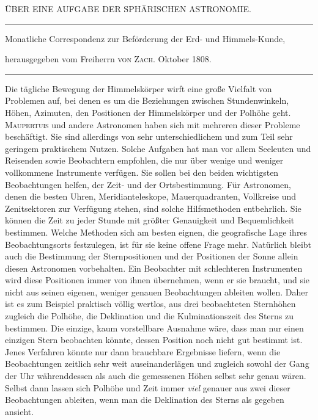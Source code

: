\clearpage{}%
\begin{center}
{\small ÜBER EINE AUFGABE DER SPHÄRISCHEN ASTRONOMIE.\par}
\medskip\hrule\medskip
{\small Monatliche Correspondenz zur Beförderung der Erd- und Himmels-Kunde,\par
herausgegeben vom Freiherrn \textsc{von Zach}. Oktober 1808.\par}
\medskip\hrule
\end{center}\medskip
Die tägliche Bewegung der Himmelskörper wirft eine große Vielfalt von Problemen auf, bei denen es um die Beziehungen zwischen Stundenwinkeln, Höhen, Azimuten, den Positionen der Himmelskörper und der Polhöhe geht. \textsc{Maupertuis} und andere Astronomen haben sich mit mehreren dieser Probleme beschäftigt. Sie sind allerdings von sehr unterschiedlichem und zum Teil sehr geringem praktischem Nutzen. Solche Aufgaben hat man vor allem Seeleuten und Reisenden sowie Beobachtern empfohlen, die nur über wenige und weniger vollkommene Instrumente verfügen. Sie sollen bei den beiden wichtigsten Beobachtungen helfen, der Zeit- und der Ortsbestimmung. Für Astronomen, denen die besten Uhren, Meridianteleskope, Mauerquadranten, Vollkreise und Zenitsektoren zur Verfügung stehen, sind solche Hilfsmethoden entbehrlich. Sie können die Zeit zu jeder Stunde mit größter Genauigkeit und Bequemlichkeit bestimmen. Welche Methoden sich am besten eignen, die geografische Lage ihres Beobachtungsorts festzulegen, ist für sie keine offene Frage mehr. Natürlich bleibt auch die Bestimmung der Sternpositionen und der Positionen der Sonne allein diesen Astronomen vorbehalten. Ein Beobachter mit schlechteren Instrumenten wird diese Positionen immer von ihnen übernehmen, wenn er sie braucht, und sie nicht aus seinen eigenen, weniger genauen Beobachtungen ableiten wollen. Daher ist es zum Beispiel praktisch völlig wertlos, aus drei beobachteten Sternhöhen
%
zugleich die Polhöhe, die Deklination und die Kulminationszeit des Sterns zu bestimmen. Die einzige, kaum vorstellbare Ausnahme wäre, dass man nur einen einzigen Stern beobachten könnte, dessen Position noch nicht gut bestimmt ist. Jenes Verfahren könnte nur dann brauchbare Ergebnisse liefern, wenn die Beobachtungen zeitlich sehr weit auseinanderlägen und zugleich sowohl der Gang der Uhr währenddessen als auch die gemessenen Höhen selbst sehr genau wären. Selbst dann lassen sich Polhöhe und Zeit immer \textit{viel} genauer aus zwei dieser Beobachtungen ableiten, wenn man die Deklination des Sterns als gegeben ansieht.

